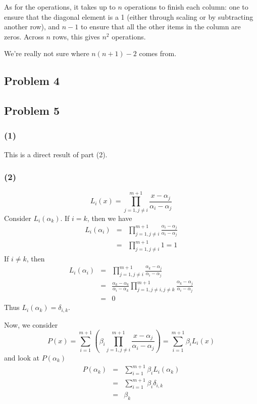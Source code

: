 \documentclass{article}
\begin{document}
As for the operations, it takes up to $n$ operations to finish each column:
one to ensure that the diagonal element is a 1 (either through scaling or by
subtracting another row), and $n-1$ to ensure that all the other items in the
column are zeros. Across $n$ rows, this gives $n^2$ operations.

We're really not sure where $n(n+1) - 2$ comes from.

\subsection{Problem 4}

\subsection{Problem 5}
\subsubsection{(1)}
This is a direct result of part (2).

\subsubsection{(2)}
\[L_i(x) = \prod_{j=1, j \neq i}^{m+1}\frac{x-\alpha_j}{\alpha_i-\alpha_j}\]
Consider $L_i(\alpha_k)$. If $i = k$, then we have 
\begin{eqnarray*}
L_i(\alpha_i) 
&=& \prod_{j=1, j \neq i}^{m+1}\frac{\alpha_i-\alpha_j}{\alpha_i-\alpha_j}\\
&=& \prod_{j=1, j \neq i}^{m+1}1 = 1
\end{eqnarray*}
If $i \neq k$, then 
\begin{eqnarray*}
L_i(\alpha_i) 
&=& \prod_{j=1, j \neq i}^{m+1}\frac{\alpha_k-\alpha_j}{\alpha_i-\alpha_j}\\
&=& \frac{\alpha_k-\alpha_k}{\alpha_i-\alpha_k}\prod_{j=1, j \neq i, j \neq
k}^{m+1}\frac{\alpha_k-\alpha_j}{\alpha_i-\alpha_j} \\
&=& 0
\end{eqnarray*}
Thus $L_i(\alpha_k) = \delta_{i,k}$.
\medskip

Now, we consider
\[P(x) = \sum_{i=1}^{m+1}
    \left(\beta_i \prod_{j=1, j \neq
    i}^{m+1}\frac{x-\alpha_j}{\alpha_i-\alpha_j}\right)
     = \sum_{i=1}^{m+1} \beta_i L_i(x)
    \]
and look at $P(\alpha_k)$
\begin{eqnarray*}
P(\alpha_k) &=& \sum_{i=1}^{m+1} \beta_i L_i(\alpha_k) \\
&=& \sum_{i=1}^{m+1} \beta_i \delta_{i,k}\\
&=& \beta_k
\end{eqnarray*}
\end{document}
